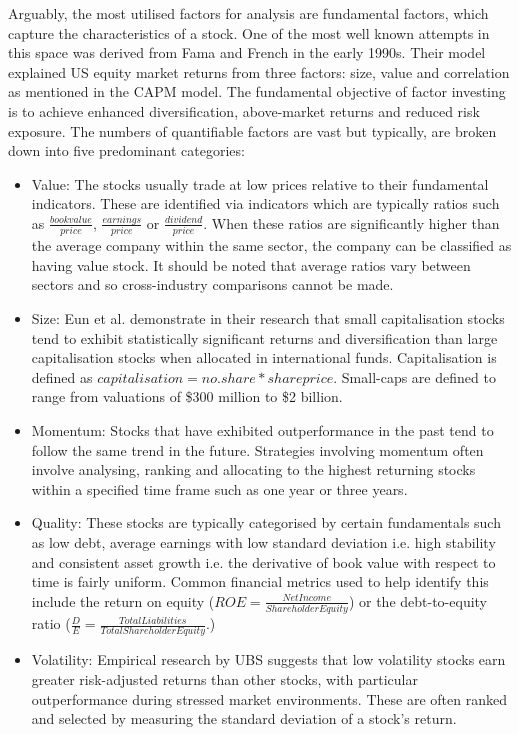 \documentclass[10pt,onecolumn,letterpaper]{article}
\begin{document}
Arguably, the most utilised factors for analysis are fundamental factors, which capture the characteristics of a stock. One of the most well known attempts in this space was derived from Fama and French in the early 1990s. Their model\cite{Fama} explained US equity market returns from three factors: size, value and correlation as mentioned in the CAPM model. The fundamental objective of factor investing is to achieve enhanced diversification, above-market returns and reduced risk exposure. The numbers of quantifiable factors are vast but typically, are broken down into five predominant categories: 

\begin{itemize}
	\item Value: The stocks usually trade at low prices relative to their fundamental indicators. These are identified via indicators which are typically ratios such as $\frac{bookvalue}{price}$, $\frac{earnings}{price}$ or $\frac{dividend}{price}$. When these ratios are significantly higher than the average company within the same sector, the company can be classified as having value stock. It should be noted that average ratios vary between sectors and so cross-industry comparisons cannot be made. 
	\item Size: Eun et al. demonstrate in their research\cite{Eun} that small capitalisation stocks tend to exhibit statistically significant returns and diversification than large capitalisation stocks when allocated in international funds. Capitalisation is defined as $capitalisation = no.share * share price$. Small-caps are defined to range from valuations of \$300 million to \$2 billion. 
	\item Momentum: Stocks that have exhibited outperformance in the past tend to follow the same trend in the future. Strategies involving momentum often involve analysing, ranking and allocating to the highest returning stocks within a specified time frame such as one year or three years. 
	\item Quality: These stocks are typically categorised by certain fundamentals such as low debt, average earnings with low standard deviation i.e. high stability and consistent asset growth i.e. the derivative of book value with respect to time is fairly uniform. Common financial metrics used to help identify this include the return on equity ($ROE = \frac{NetIncome}{ShareholderEquity}$) or the debt-to-equity ratio ($\frac{D}{E} = \frac{Total Liabilities}{Total Shareholder Equity}$.)
	\item Volatility: Empirical research by UBS\cite{Merz} suggests that low volatility stocks earn greater risk-adjusted returns than other stocks, with particular outperformance during stressed market environments. These are often ranked and selected by measuring the standard deviation of a stock's return. 
\end{itemize}
\end{document}

